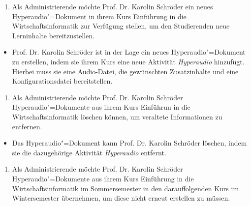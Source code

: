 \begin{enumerate}[leftmargin=1.3cm,label=US-\arabic*:,ref=US-\arabic*]
\vspace{0.1cm}
\item \label{US-Admin-Erstellen-Eval} Als Administrierende möchte Prof. Dr. Karolin Schröder ein neues Hyperaudio"=Dokument in ihrem Kurs \glqq Einführung in die Wirtschaftsinformatik\grqq{} zur Verfügung stellen, um den Studierenden neue Lerninhalte bereitzustellen.
\end{enumerate}
\begin{itemize}[leftmargin=1.3cm]
\item[\Checkmark] Prof. Dr. Karolin Schröder ist in der Lage ein neues Hyperaudio"=Dokument zu erstellen, indem sie ihrem Kurs eine neue Aktivität \textit{Hyperaudio} hinzufügt. Hierbei muss sie eine Audio-Datei, die gewünschten Zusatzinhalte und eine Konfigurationsdatei bereitstellen.
\end{itemize}
\vspace{0.25cm}
\begin{enumerate}[resume*]
\item \label{US-Admin-Loeschen-Eval} Als Administrierende möchte Prof. Dr. Karolin Schröder Hyperaudio"=Dokumente aus ihrem Kurs \glqq Einführun in die Wirtschaftsinformatik\grqq{} löschen können, um veraltete Informationen zu entfernen.
\end{enumerate}
\begin{itemize}[resume*]
\item[\Checkmark] 
Das Hyperaudio"=Dokument kann Prof. Dr. Karolin Schröder löschen, indem sie die dazugehörige Aktivität \textit{Hyperaudio} entfernt.
\end{itemize}
\vspace{0.25cm}
\begin{enumerate}[resume*]
\item \label{US-Admin-Semester-Eval} Als Administrierende möchte Prof. Dr. Karolin Schröder Hyperaudio"=Dokumente aus ihrem Kurs \glqq Einführung in die Wirtschaftsinformatik\grqq{} im Sommersemester in den darauffolgenden Kurs im Wintersemester übernehmen, um diese nicht erneut erstellen zu müssen.
\end{enumerate}

